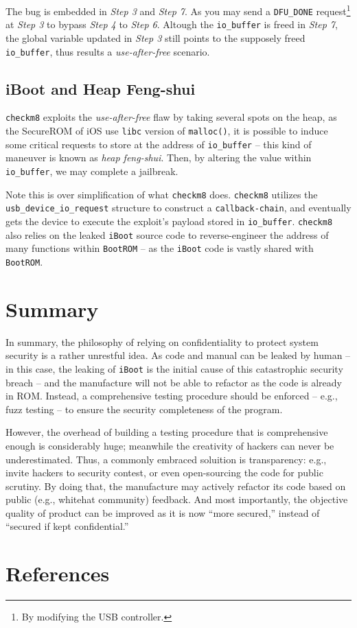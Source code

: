 \documentclass[10pt]{article}
\newcommand{\inlinecode}{\texttt}
\begin{document}
The bug is embedded in \textit{Step 3} and \textit{Step 7}. As you may send a \inlinecode{DFU\_DONE} request\footnote{By modifying the USB controller.} at \textit{Step 3} to bypass \textit{Step 4} to \textit{Step 6}. Altough the \inlinecode{io\_buffer} is freed in \textit{Step 7}, the global variable updated in \textit{Step 3} still points to the supposely freed \inlinecode{io\_buffer}, thus results a \textit{use-after-free} scenario.

\subsection{iBoot and Heap Feng-shui}
\inlinecode{checkm8} exploits the \textit{use-after-free} flaw by taking several spots on the heap, as the SecureROM of iOS use \inlinecode{libc} version of \inlinecode{malloc()}, it is possible to induce some critical requests to store at the address of \inlinecode{io\_buffer} -- this kind of maneuver is known as \textit{heap feng-shui}. Then, by altering the value within \inlinecode{io\_buffer}, we may complete a jailbreak.

Note this is over simplification of what \inlinecode{checkm8} does. \inlinecode{checkm8} utilizes the    \inlinecode{usb\_device\_io\_request} structure to construct a \inlinecode{callback-chain}, and eventually gets the device to execute the exploit's payload stored in \inlinecode{io\_buffer}. \inlinecode{checkm8} also relies on the leaked \inlinecode{iBoot} source code to reverse-engineer the address of many functions within \inlinecode{BootROM} -- as the \inlinecode{iBoot} code is vastly shared with \inlinecode{BootROM}.


\section{Summary}
In summary, the philosophy of relying on confidentiality to protect system security is a rather unrestful idea. As code and manual can be leaked by human -- in this case, the leaking of \inlinecode{iBoot} is the initial cause of this catastrophic security breach -- and the manufacture will not be able to refactor as the code is already in ROM. Instead, a comprehensive testing procedure should be enforced -- e.g., fuzz testing -- to ensure the security completeness of the program.

However, the overhead of building a testing procedure that is comprehensive enough is considerably huge; meanwhile the creativity of hackers can never be underestimated. Thus, a commonly embraced soluition is transparency: e.g., invite hackers to security contest, or even open-sourcing the code for public scrutiny. By doing that, the manufacture may actively refactor its code based on public (e.g., whitehat community) feedback. And most importantly, the objective quality of product can be improved as it is now ``more secured,'' instead of ``secured if kept confidential.''


\newpage
\section{References}

\nocite{*}
\raggedright


\end{document}
